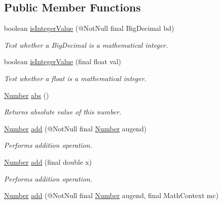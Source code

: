 \subsection*{Public Member Functions}
\begin{DoxyCompactItemize}
\item 
boolean \hyperlink{classcom_1_1aarrelaakso_1_1drawl_1_1_drawl_number_aae7f631882c9400f8fcc7d5c04441d2b}{is\+Integer\+Value} (@Not\+Null final Big\+Decimal bd)
\begin{DoxyCompactList}\small\item\em Test whether a Big\+Decimal is a mathematical integer. \end{DoxyCompactList}\item 
boolean \hyperlink{classcom_1_1aarrelaakso_1_1drawl_1_1_drawl_number_a6400df8bf99b502371a39347f8d7dff2}{is\+Integer\+Value} (final float val)
\begin{DoxyCompactList}\small\item\em Test whether a float is a mathematical integer. \end{DoxyCompactList}\item 
\hyperlink{interfacecom_1_1aarrelaakso_1_1drawl_1_1_number}{Number} \hyperlink{classcom_1_1aarrelaakso_1_1drawl_1_1_drawl_number_a2bdcf6f7da129ae45c46f7e91bc65636}{abs} ()
\begin{DoxyCompactList}\small\item\em Returns absolute value of this number. \end{DoxyCompactList}\item 
\hyperlink{interfacecom_1_1aarrelaakso_1_1drawl_1_1_number}{Number} \hyperlink{classcom_1_1aarrelaakso_1_1drawl_1_1_drawl_number_a484120b1cacb13f1266bf1d3f002ce3d}{add} (@Not\+Null final \hyperlink{interfacecom_1_1aarrelaakso_1_1drawl_1_1_number}{Number} augend)
\begin{DoxyCompactList}\small\item\em Performs addition operation. \end{DoxyCompactList}\item 
\hyperlink{interfacecom_1_1aarrelaakso_1_1drawl_1_1_number}{Number} \hyperlink{classcom_1_1aarrelaakso_1_1drawl_1_1_drawl_number_adf7216ecb118a2bbd1d4aba6a51110bc}{add} (final double x)
\begin{DoxyCompactList}\small\item\em Performs addition operation. \end{DoxyCompactList}\item 
\hyperlink{interfacecom_1_1aarrelaakso_1_1drawl_1_1_number}{Number} \hyperlink{classcom_1_1aarrelaakso_1_1drawl_1_1_drawl_number_a1ecd88ae492b29cf92013f7441f488f8}{add} (@Not\+Null final \hyperlink{interfacecom_1_1aarrelaakso_1_1drawl_1_1_number}{Number} augend, final Math\+Context mc)

\end{DoxyCompactItemize}
